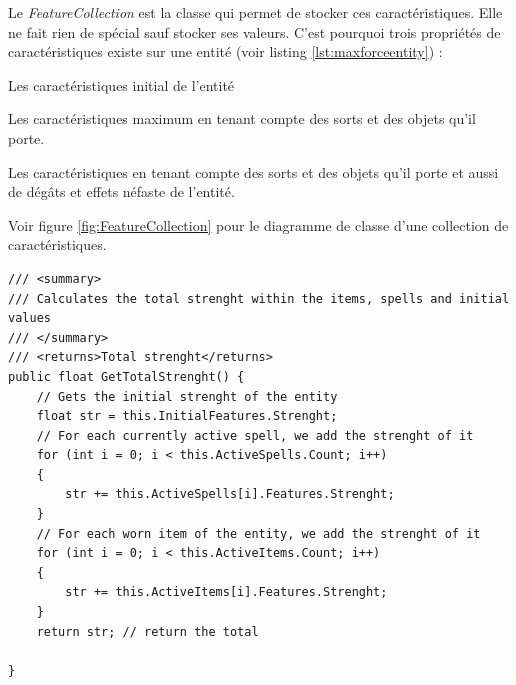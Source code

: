 \documentclass[11pt, a4paper, oneside]{report}
\begin{document}
Le \textit{FeatureCollection} est la classe qui permet de stocker ces caractéristiques. Elle ne fait rien de spécial sauf stocker ses valeurs. C'est pourquoi trois propriétés de caractéristiques existe sur une entité (voir listing \ref{lst:maxforceentity}) :
\begin{description}[labelindent=0.5cm]
	\item[InitialValue] Les caractéristiques initial de l'entité
	\item[MaximizedFeatures] Les caractéristiques maximum en tenant compte des sorts et des objets qu'il porte.
	\item[ActualFeatures] Les caractéristiques en tenant compte des sorts et des objets qu'il porte et aussi de dégâts et effets néfaste de l'entité.
\end{description}
Voir figure \ref{fig:FeatureCollection} pour le diagramme de classe d'une collection de caractéristiques.
\begin{lstlisting}[caption=Exemple de calcul de la force maximal d'une entité, label=lst:maxforceentity]
/// <summary>
/// Calculates the total strenght within the items, spells and initial values
/// </summary>
/// <returns>Total strenght</returns>
public float GetTotalStrenght() {
	// Gets the initial strenght of the entity
	float str = this.InitialFeatures.Strenght;
	// For each currently active spell, we add the strenght of it
	for (int i = 0; i < this.ActiveSpells.Count; i++)
	{
		str += this.ActiveSpells[i].Features.Strenght;
	}
	// For each worn item of the entity, we add the strenght of it
	for (int i = 0; i < this.ActiveItems.Count; i++)
	{
		str += this.ActiveItems[i].Features.Strenght;
	}
	return str; // return the total
	
}
\end{lstlisting}
\end{document}
